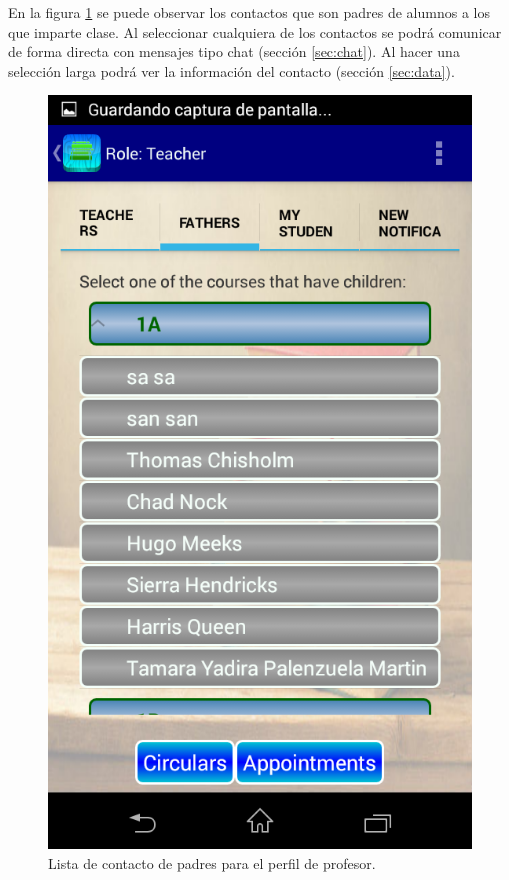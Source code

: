 			En la figura \ref{fig:profePadre} se puede observar los contactos que son padres de alumnos a los que imparte clase. Al seleccionar cualquiera de los contactos se podrá comunicar de forma directa con mensajes tipo chat (sección \ref{sec:chat}). Al hacer una selección larga podrá ver la información del contacto (sección \ref{sec:data}).
			
			\begin{figure}[h !]
				\centering
				\includegraphics[scale=0.2]{Imagenes/App/profePadre}
				\caption{Lista de contacto de padres para el perfil de profesor.}
				\label{fig:profePadre}
			\end{figure}
		
